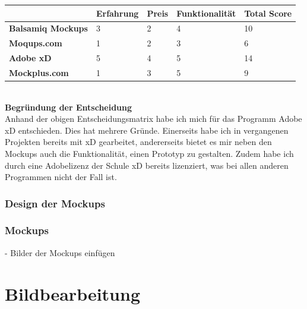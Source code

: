\documentclass[11pt]{article}
\begin{document}
    \begin{center}
        \begin{tabular}{ | p{4cm} | p{2.5cm} | p{2.5cm} | p{3cm} | p{2.5cm} | }
            \hline
            & \textbf{Erfahrung} & \textbf{Preis} & \textbf{Funktionalität} & \textbf{Total Score} \\ \hline
            \textbf{Balsamiq Mockups} & 3                  & 2              & 4                       & 10                   \\ \hline
            \textbf{Moqups.com}       & 1                  & 2              & 3                       & 6                    \\ \hline
            \textbf{Adobe xD}         & 5                  & 4              & 5                       & 14                    \\ \hline
            \textbf{Mockplus.com}     & 1                  & 3              & 5                       & 9                    \\ \hline
        \end{tabular}
    \end{center}
    \\

    \textbf{Begründung der Entscheidung}\\
    Anhand der obigen Entscheidungsmatrix habe ich mich für das Programm Adobe xD entschieden. Dies hat mehrere
    Gründe. Einerseits habe ich in vergangenen Projekten bereits mit xD gearbeitet, andererseits bietet es
    mir neben den Mockups auch die Funktionalität, einen Prototyp zu gestalten. Zudem habe ich durch eine
    Adobelizenz der Schule xD bereits lizenziert, was bei allen anderen Programmen nicht der Fall ist.

    \subsubsection{Design der Mockups}

    \subsubsection{Mockups}
    - Bilder der Mockups einfügen



    \section{Bildbearbeitung}
\end{document}
